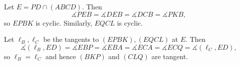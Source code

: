 Let $E=PD\cap\left(ABCD\right)$. Then \[\measuredangle{PEB}=\measuredangle{DEB}=\measuredangle{DCB}=\measuredangle{PKB},\] so $EPBK$ is cyclic. Similarly, $EQCL$ is cyclic.

Let $\ell_B,\ell_C$ be the tangents to $\left(EPBK\right),\left(EQCL\right)$ at $E$. Then \[\measuredangle{\left(\ell_B,ED\right)}=\measuredangle{EBP}=\measuredangle{EBA}=\measuredangle{ECA}=\measuredangle{ECQ}=\measuredangle{\left(\ell_C,ED\right)},\] so $\ell_B=\ell_C$ and hence $\left(BKP\right)$ and $\left(CLQ\right)$ are tangent.